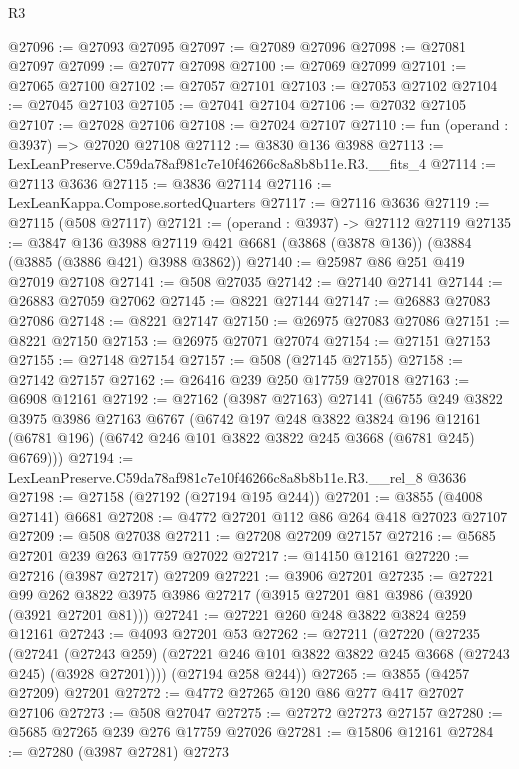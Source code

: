 \begin{lexlean}{R3}
\begin{coremodule}
@27096 := @27093 @27095
@27097 := @27089 @27096
@27098 := @27081 @27097
@27099 := @27077 @27098
@27100 := @27069 @27099
@27101 := @27065 @27100
@27102 := @27057 @27101
@27103 := @27053 @27102
@27104 := @27045 @27103
@27105 := @27041 @27104
@27106 := @27032 @27105
@27107 := @27028 @27106
@27108 := @27024 @27107
@27110 := fun (operand : @3937) => @27020 @27108
@27112 := @3830 @136 @3988
@27113 := LexLeanPreserve.C59da78af981c7e10f46266c8a8b8b11e.R3.__fits_4
@27114 := @27113 @3636
@27115 := @3836 @27114
@27116 := LexLeanKappa.Compose.sortedQuarters
@27117 := @27116 @3636
@27119 := @27115 (@508 @27117)
@27121 := (operand : @3937) -> @27112 @27119
@27135 := @3847
    @136
    @3988
    @27119
    @421
    @6681
    (@3868 (@3878 @136))
    (@3884 (@3885 (@3886 @421) @3988 @3862))
@27140 := @25987 @86 @251 @419 @27019 @27108
@27141 := @508 @27035
@27142 := @27140 @27141
@27144 := @26883 @27059 @27062
@27145 := @8221 @27144
@27147 := @26883 @27083 @27086
@27148 := @8221 @27147
@27150 := @26975 @27083 @27086
@27151 := @8221 @27150
@27153 := @26975 @27071 @27074
@27154 := @27151 @27153
@27155 := @27148 @27154
@27157 := @508 (@27145 @27155)
@27158 := @27142 @27157
@27162 := @26416 @239 @250 @17759 @27018
@27163 := @6908 @12161
@27192 := @27162
    (@3987 @27163)
    @27141
    (@6755
      @249
      @3822
      @3975
      @3986
      @27163
      @6767
      (@6742
        @197
        @248
        @3822
        @3824
        @196
        @12161
        (@6781 @196)
        (@6742 @246 @101 @3822 @3822 @245 @3668 (@6781 @245) @6769)))
@27194 := LexLeanPreserve.C59da78af981c7e10f46266c8a8b8b11e.R3.__rel_8 @3636
@27198 := @27158 (@27192 (@27194 @195 @244))
@27201 := @3855 (@4008 @27141) @6681
@27208 := @4772 @27201 @112 @86 @264 @418 @27023 @27107
@27209 := @508 @27038
@27211 := @27208 @27209 @27157
@27216 := @5685 @27201 @239 @263 @17759 @27022
@27217 := @14150 @12161
@27220 := @27216 (@3987 @27217) @27209
@27221 := @3906 @27201
@27235 := @27221
    @99
    @262
    @3822
    @3975
    @3986
    @27217
    (@3915 @27201 @81 @3986 (@3920 (@3921 @27201 @81)))
@27241 := @27221 @260 @248 @3822 @3824 @259 @12161
@27243 := @4093 @27201 @53
@27262 := @27211
    (@27220
      (@27235
        (@27241
          (@27243 @259)
          (@27221 @246 @101 @3822 @3822 @245 @3668 (@27243 @245) (@3928 @27201))))
      (@27194 @258 @244))
@27265 := @3855 (@4257 @27209) @27201
@27272 := @4772 @27265 @120 @86 @277 @417 @27027 @27106
@27273 := @508 @27047
@27275 := @27272 @27273 @27157
@27280 := @5685 @27265 @239 @276 @17759 @27026
@27281 := @15806 @12161
@27284 := @27280 (@3987 @27281) @27273

\end{coremodule}
\end{lexlean}
